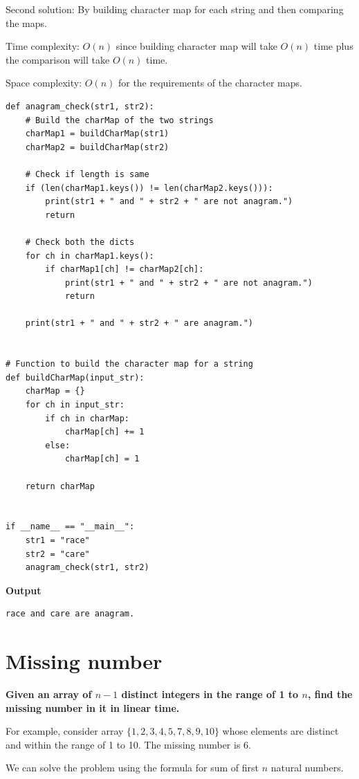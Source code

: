 \documentclass[a4paper,11pt]{book}
\begin{document}
\noindent Second solution: By building character map for each string and then comparing the maps.

\noindent Time complexity:  $O(n)$ since building character map will take  $O(n)$ time plus the comparison will take $O(n)$ time.

\noindent Space complexity: $O(n)$ for the requirements of the character maps.
\begin{lstlisting}
def anagram_check(str1, str2):
    # Build the charMap of the two strings
    charMap1 = buildCharMap(str1)
    charMap2 = buildCharMap(str2)

    # Check if length is same
    if (len(charMap1.keys()) != len(charMap2.keys())):
        print(str1 + " and " + str2 + " are not anagram.")
        return

    # Check both the dicts
    for ch in charMap1.keys():
        if charMap1[ch] != charMap2[ch]:
            print(str1 + " and " + str2 + " are not anagram.")
            return

    print(str1 + " and " + str2 + " are anagram.")


# Function to build the character map for a string
def buildCharMap(input_str):
    charMap = {}
    for ch in input_str:
        if ch in charMap:
            charMap[ch] += 1
        else:
            charMap[ch] = 1

    return charMap


if __name__ == "__main__":
    str1 = "race"
    str2 = "care"
    anagram_check(str1, str2)
\end{lstlisting}
\textbf{Output}
\begin{lstlisting}
race and care are anagram.
\end{lstlisting}

\newpage
\section{Missing number}

\textbf{Given an array of $n-1$ distinct integers in the range of 1 to $n$, find the missing number in it in linear time.}
\vspace{5mm}

\noindent For example, consider array $\{1, 2, 3, 4, 5, 7, 8, 9, 10\}$ whose elements are distinct and within the range of 1 to 10. The missing number is 6.

\vspace{5mm}

\noindent We can solve the problem using the formula for sum of first $n$ natural numbers.
\end{document}
